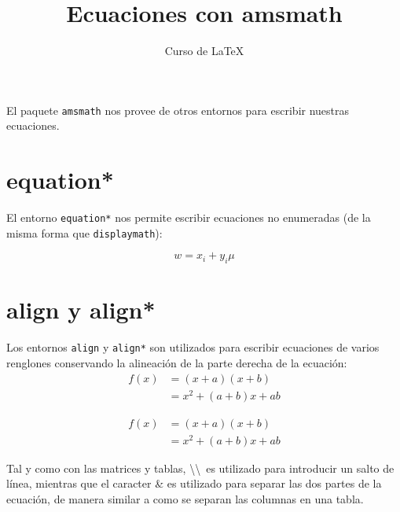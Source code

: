 \documentclass[12pt,letterpaper]{article}
\title{Ecuaciones con amsmath}
\author{Curso de \LaTeX}
\date{}
\begin{document}
\maketitle

El paquete \texttt{amsmath} nos provee de otros entornos para escribir nuestras ecuaciones. 

\section{equation*}

El entorno \texttt{equation*} nos permite escribir ecuaciones no enumeradas (de la misma forma que \texttt{displaymath}):

\begin{equation*}
  w = x_{i} + y_{i}\mu
\end{equation*}

\section{align y align*}

Los entornos \texttt{align} y \texttt{align*} son utilizados para escribir ecuaciones de varios renglones conservando la alineación de la parte derecha de la ecuación:
\begin{align}
 f(x) &= (x+a)(x+b) \\
 &= x^2 + (a+b)x + ab
\end{align}

\begin{align*}
	f(x) &= (x+a)(x+b) \\
	&= x^2 + (a+b)x + ab
\end{align*}

Tal y como con las matrices y tablas,  \textbackslash\textbackslash\ es utilizado para introducir un salto de línea, mientras que el caracter \& es utilizado para separar las dos partes de la ecuación, de manera similar a como se separan las columnas en una tabla.
\end{document}

